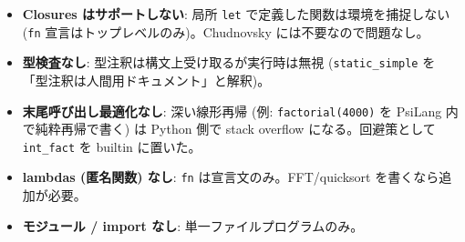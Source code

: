\documentclass[
]{ltjsarticle}
\providecommand{\tightlist}{%
  \setlength{\itemsep}{0pt}\setlength{\parskip}{0pt}}
\begin{document}
\begin{itemize}
\tightlist
\item
  \textbf{Closures はサポートしない}: 局所 \texttt{let}
  で定義した関数は環境を捕捉しない (\texttt{fn}
  宣言はトップレベルのみ)。Chudnovsky には不要なので問題なし。
\item
  \textbf{型検査なし}: 型注釈は構文上受け取るが実行時は無視
  (\texttt{static\_simple} を「型注釈は人間用ドキュメント」と解釈)。
\item
  \textbf{末尾呼び出し最適化なし}: 深い線形再帰 (例:
  \texttt{factorial(4000)} を PsiLang 内で純粋再帰で書く) は Python 側で
  stack overflow になる。回避策として \texttt{int\_fact} を builtin
  に置いた。
\item
  \textbf{lambdas (匿名関数) なし}: \texttt{fn}
  は宣言文のみ。FFT/quicksort を書くなら追加が必要。
\item
  \textbf{モジュール / import なし}: 単一ファイルプログラムのみ。
\end{itemize}
\end{document}
